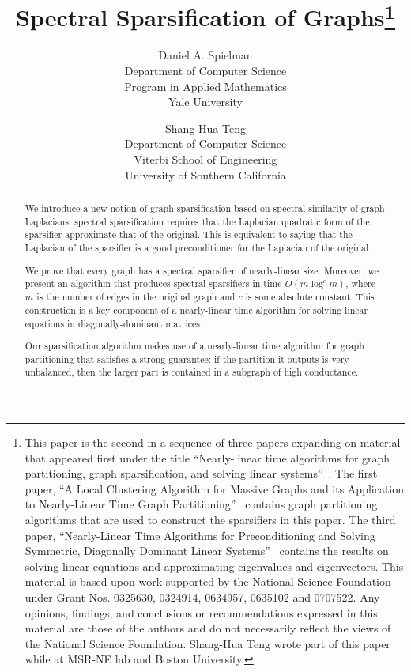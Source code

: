 \documentclass[11pt]{article}
\def\bigO#1{\widetilde{\mathcal{O}} \left( #1 \right)}
\def\bigO#1{O\left(#1  \right)}
\begin{document}
\title{Spectral Sparsification of Graphs\thanks{
This paper is the second in a sequence of three papers expanding
  on material that appeared first under the title
  ``Nearly-linear time algorithms for graph partitioning, 
    graph sparsification, and solving linear systems''~\cite{SpielmanTengPrecon}.
The first paper,
``A Local Clustering Algorithm for Massive Graphs and its Application to Nearly-Linear Time Graph Partitioning''~\cite{SpielmanTengCuts}
 contains graph partitioning algorithms that are used to construct the sparsifiers in this paper.
The third paper, ``Nearly-Linear Time Algorithms for Preconditioning and Solving Symmetric, Diagonally Dominant Linear Systems''~\cite{SpielmanTengLinsolve} contains the results
  on solving linear equations and approximating eigenvalues and eigenvectors.
\vskip 0.01in
This material is based upon work supported by the National Science Foundation 
  under Grant Nos. 0325630, 0324914, 0634957, 0635102 and 0707522.
Any opinions, findings, and conclusions or recommendations expressed in this material are those of the authors and do not necessarily reflect the views of the National Science Foundation.
\vskip 0.01in
Shang-Hua Teng wrote part of this paper while at MSR-NE lab and Boston
University.}
}

\author{
Daniel A. Spielman\\
Department of Computer Science\\
Program in Applied Mathematics\\
Yale University
\and
Shang-Hua Teng\\
Department of Computer Science\\
Viterbi School of Engineering\\
University of Southern California}

\maketitle

\begin{abstract}
We introduce a new notion of graph sparsification based on 
  spectral similarity of graph Laplacians:
 spectral sparsification requires that the Laplacian quadratic form
  of the sparsifier approximate that
  of the original.
This is equivalent to saying that the Laplacian of the sparsifier
  is a good preconditioner for the Laplacian of the original.

We prove that every graph has a spectral sparsifier of nearly-linear size.
Moreover, we present an algorithm that produces spectral sparsifiers
   in time $\bigO{m \log^{c} m}$, where $m$ is the number of edges in the
   original graph and $c$ is some absolute constant.
This construction is a key component of a nearly-linear time algorithm
  for solving linear equations in diagonally-dominant matrices.

Our sparsification algorithm makes use of a nearly-linear time algorithm for graph
  partitioning that satisfies a strong guarantee:
 if the partition it outputs is very unbalanced, then the larger part is contained in
  a subgraph of high conductance.
\end{abstract}
\end{document}
